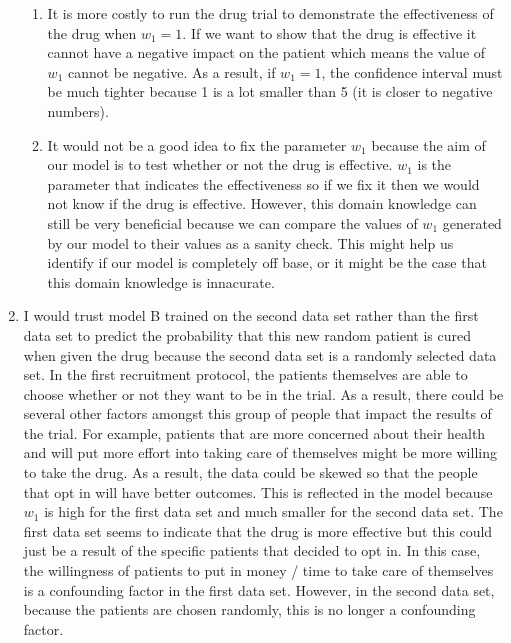 \documentclass[submit]{harvardml}
\begin{document}
\begin{enumerate}
\begin{enumerate}
        \item It is more costly to run the drug trial to demonstrate the effectiveness of the drug when $w_1=1$. If we want to show that the drug is effective it cannot have a negative impact on the patient which means the value of $w_1$ cannot be negative. As a result, if $w_1=1$, the confidence interval must be much tighter because 1 is a lot smaller than 5 (it is closer to negative numbers).
        \item It would not be a good idea to fix the parameter $w_1$ because the aim of our model is to test whether or not the drug is effective. $w_1$ is the parameter that indicates the effectiveness so if we fix it then we would not know if the drug is effective. However, this domain knowledge can still be very beneficial because we can compare the values of $w_1$ generated by our model to their values as a sanity check. This might help us identify if our model is completely off base, or it might be the case that this domain knowledge is innacurate. \\
    \end{enumerate}
    \item 
    I would trust model B trained on the second data set rather than the first data set to predict the probability that this new random patient is cured when given the drug because the second data set is a randomly selected data set. In the first recruitment protocol, the patients themselves are able to choose whether or not they want to be in the trial. As a result, there could be several other factors amongst this group of people that impact the results of the trial. For example, patients that are more concerned about their health and will put more effort into taking care of themselves might be more willing to take the drug. As a result, the data could be skewed so that the people that opt in will have better outcomes. This is reflected in the model because $w_1$ is high for the first data set and much smaller for the second data set. The first data set seems to indicate that the drug is more effective but this could just be a result of the specific patients that decided to opt in. In this case, the willingness of patients to put in money / time to take care of themselves is a confounding factor in the first data set. However, in the second data set, because the patients are chosen randomly, this is no longer a confounding factor.   
    

\end{enumerate}
\end{document}
